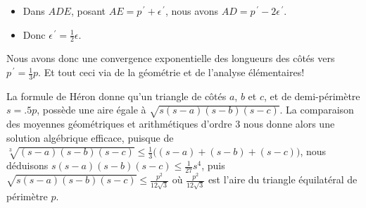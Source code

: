 \begin{remark}
\begin{enumerate}
\begin{itemize}
			\item Dans $ADE$, posant $AE = p^{\,\prime} + \epsilon^{\,\prime}$, nous avons $AD = p^{\,\prime} - 2 \epsilon^{\,\prime}$.

			\item Donc $\epsilon^{\,\prime} = \frac12 \epsilon$.
		\end{itemize}
		
		\noindent
		Nous avons donc une convergence exponentielle des longueurs des côtés vers $p^{\,\prime} = \frac13 p$. Et tout ceci via de la géométrie et de l'analyse élémentaires!
	\end{enumerate}
\end{remark}




\begin{remark}
	La formule de Héron donne qu'un triangle de côtés $a$, $b$ et $c$, et de demi-périmètre $s = \num{.5} p$, possède une aire égale à $\sqrt{s(s - a)(s - b)(s - c)}$.
	La comparaison des moyennes géométriques et arithmétiques d'ordre $3$ nous donne alors une solution algébrique efficace, puisque de
	$\sqrt[3]{(s - a)(s - b)(s - c)} \leq \frac13 \big( (s - a) + (s - b) + (s - c) \big)$,
	nous déduisons
	$s(s - a)(s - b)(s - c) \leq \frac{1}{27} s^4$,
	puis
	$\sqrt{s(s - a)(s - b)(s - c)} \leq \frac{p^2}{12 \sqrt{3}}$
	où $\frac{p^2}{12 \sqrt{3}}$ est l'aire du triangle équilatéral de périmètre $p$.
\end{remark}




